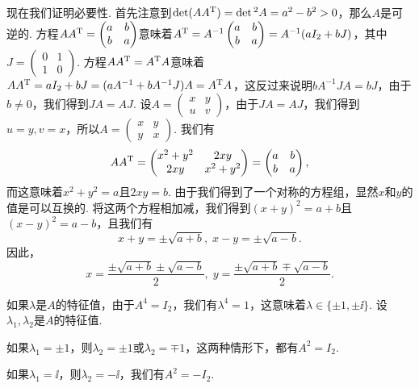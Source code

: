 \begin{solution}
  现在我们证明必要性. 首先注意到$\det(AA^{\mathrm T})=\det{}^2A=a^2-b^2>0$，那么$A$是可逆的. 方程$AA^{\mathrm T}=\begin{pmatrix}
    a & b \\
    b & a
  \end{pmatrix}$意味着$A^{\mathrm T}=A^{-1}\begin{pmatrix}
    a & b \\
    b & a
  \end{pmatrix}=A^{-1}(aI_2+bJ)$，其中$J=\begin{pmatrix}
    0 & 1 \\
    1 & 0
  \end{pmatrix}$. 方程$AA^{\mathrm T}=A^{\mathrm T} A$意味着$AA^{\mathrm T}=aI_2+bJ=(aA^{-1}+bA^{-1}J)A=A^{\mathrm T} A$，这反过来说明$bA^{-1}JA=bJ$，由于$b\ne0$，我们得到$JA=AJ$. 设$A=\begin{pmatrix}
    x & y \\
    u & v
  \end{pmatrix}$，由于$JA=AJ$，我们得到$u=y,v=x$，所以$A=\begin{pmatrix}
    x & y \\
    y & x
  \end{pmatrix}$. 我们有
  \[
    AA^{\mathrm T} = \begin{pmatrix}
      x^2 + y^2 & 2xy \\
      2xy & x^2 + y^2
    \end{pmatrix} =
    \begin{pmatrix}
      a & b \\
      b & a
    \end{pmatrix},
  \]
  而这意味着$x^2+y^2=a$且$2xy=b$. 由于我们得到了一个对称的方程组，显然$x$和$y$的值是可以互换的. 将这两个方程相加减，我们得到$(x+y)^2=a+b$且$(x-y)^2=a-b$，且我们有
  \[
    x + y = \pm\sqrt{a+b},\;
    x - y = \pm\sqrt{a-b}.
  \]
  因此，
  \[
    x = \frac{\pm\sqrt{a+b}\pm\sqrt{a-b}}2,\;
    y = \frac{\pm\sqrt{a+b}\mp\sqrt{a-b}}2.
  \]
\end{solution}

\begin{solution}
  如果$\lambda$是$A$的特征值，由于$A^4=I_2$，我们有$\lambda^4=1$，这意味着$\lambda\in\{\pm1,\pm\ii\}$. 设$\lambda_1,\lambda_2$是$A$的特征值.

  如果$\lambda_1=\pm1$，则$\lambda_2=\pm1$或$\lambda_2=\mp1$，这两种情形下，都有$A^2=I_2$.

  如果$\lambda_1=\ii$，则$\lambda_2=-\ii$，我们有$A^2=-I_2$.
\end{solution}

